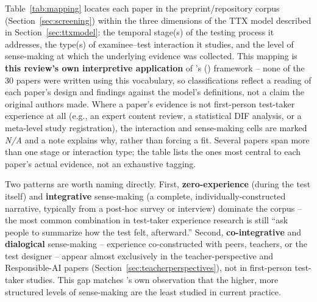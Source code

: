 \documentclass[11pt]{article}
\begin{document}
Table~\ref{tab:mapping} locates each paper in the preprint/repository corpus (Section~\ref{sec:screening}) within the three dimensions of the TTX model described in Section~\ref{sec:ttxmodel}: the temporal stage(s) of the testing process it addresses, the type(s) of examinee--test interaction it studies, and the level of sense-making at which the underlying evidence was collected. This mapping is \textbf{this review's own interpretive application} of \citeauthor{araneda2025ttxmodel}'s (\citeyear{araneda2025ttxmodel}) framework -- none of the 30 papers were written using this vocabulary, so classifications reflect a reading of each paper's design and findings against the model's definitions, not a claim the original authors made. Where a paper's evidence is not first-person test-taker experience at all (e.g., an expert content review, a statistical DIF analysis, or a meta-level study registration), the interaction and sense-making cells are marked \emph{N/A} and a note explains why, rather than forcing a fit. Several papers span more than one stage or interaction type; the table lists the ones most central to each paper's actual evidence, not an exhaustive tagging.

Two patterns are worth naming directly. First, \textbf{zero-experience} (during the test itself) and \textbf{integrative} sense-making (a complete, individually-constructed narrative, typically from a post-hoc survey or interview) dominate the corpus -- the most common combination in test-taker experience research is still ``ask people to summarize how the test felt, afterward.'' Second, \textbf{co-integrative} and \textbf{dialogical} sense-making -- experience co-constructed with peers, teachers, or the test designer -- appear almost exclusively in the teacher-perspective and Responsible-AI papers (Section~\ref{sec:teacherperspectives}), not in first-person test-taker studies. This gap matches \citeauthor{araneda2025ttxmodel}'s own observation that the higher, more structured levels of sense-making are the least studied in current practice.
\end{document}
